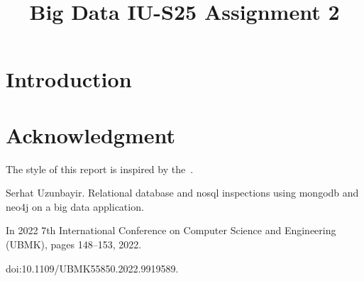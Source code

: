 \documentclass[conference]{IEEEtran}
\begin{document}
\title{Big Data IU-S25 Assignment 2}

\author{
}

\maketitle

\begin{abstract}

    \lipsum[1]

\end{abstract}

\section{Introduction}

\lipsum[2]

\section*{Acknowledgment}

The style of this report is inspired by the~\cite{uzunbayir}.

\begin{thebibliography}{00}

     Serhat Uzunbayir. Relational database and nosql inspections using mongodb and neo4j on a big data application.

    In 2022 7th International Conference on Computer Science and Engineering (UBMK), pages 148--153, 2022.

    doi:10.1109/UBMK55850.2022.9919589.

\end{thebibliography}
\end{document}
